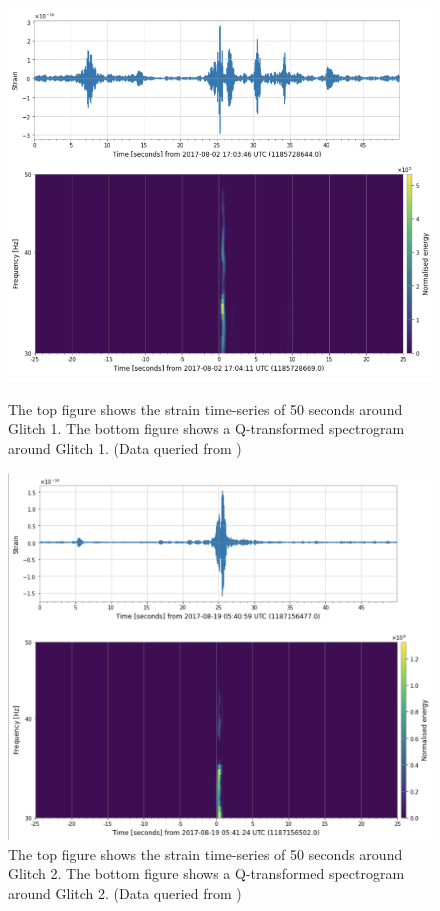 \documentclass[preprint,
letterpaper,
 amsmath,amssymb,
 aps,
]{revtex4-2}
\begin{document}
\begin{figure}[!tbp]
  \centering
  \begin{minipage}[b]{0.48\textwidth}
    \includegraphics[width=\textwidth]{loud 69 graphics.png}
    \caption{The top figure shows the strain time-series of 50 seconds around Glitch 1. The bottom figure shows a Q-transformed spectrogram around Glitch 1. (Data queried from \cite{collaboration2019open})}

  \end{minipage}
  \hfill
  \begin{minipage}[b]{0.48\textwidth}
    \includegraphics[width=\textwidth]{loud 02 graphics.png}
    \caption{The top figure shows the strain time-series of 50 seconds around Glitch 2. The bottom figure shows a Q-transformed spectrogram around Glitch 2. (Data queried from \cite{collaboration2019open})}
  \end{minipage}
\end{figure}
\end{document}
